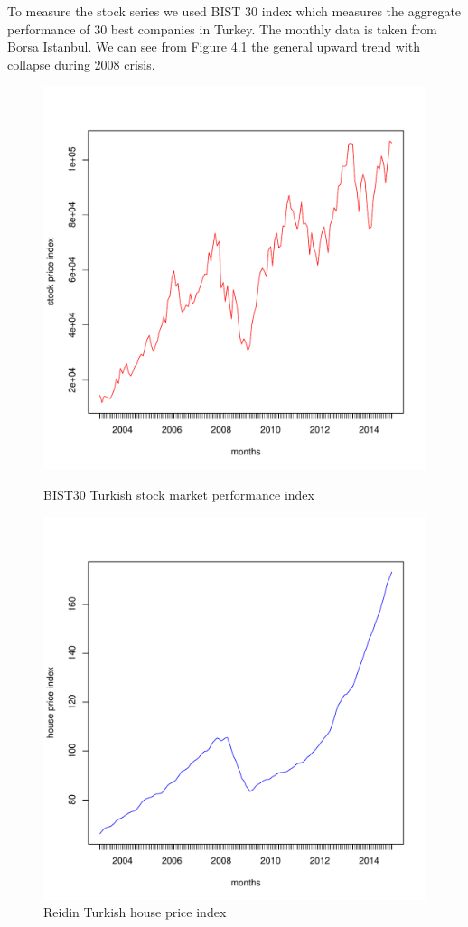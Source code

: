 \documentclass[]{elsarticle}
\begin{document}
To measure the stock series we used BIST 30 index which measures the aggregate performance of 30 best companies in Turkey. The monthly data is taken from Borsa Istanbul. We can see from Figure 4.1 the general upward trend with collapse during 2008 crisis.

\begin{figure}
	\centering
    \begin{minipage}{0.45\textwidth}
		\centering
		\includegraphics[scale=0.4]{figs/bist.pdf}
		\caption{BIST30 Turkish stock market performance index}
	\end{minipage}
	\hfill
    \begin{minipage}{0.45\textwidth}
		\centering
		\includegraphics[scale=0.4]{figs/reidin.pdf}
		\caption{Reidin Turkish house price index}
	\end{minipage}
\end{figure}
\end{document}
